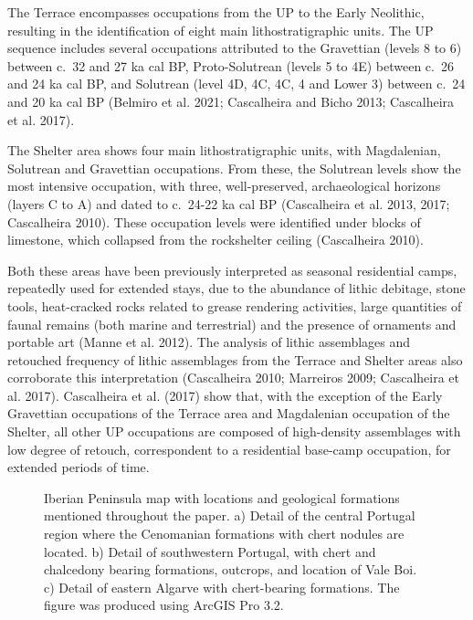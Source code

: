 \documentclass[
  a4paper,
  DIV=11,
  numbers=noendperiod]{scrreprt}
\begin{document}
The Terrace encompasses occupations from the UP to the Early Neolithic,
resulting in the identification of eight main lithostratigraphic units.
The UP sequence includes several occupations attributed to the
Gravettian (levels 8 to 6) between c.~32 and 27 ka cal BP,
Proto-Solutrean (levels 5 to 4E) between c.~26 and 24 ka cal BP, and
Solutrean (level 4D, 4C, 4C, 4 and Lower 3) between c.~24 and 20 ka cal
BP (Belmiro et al. 2021; Cascalheira and Bicho 2013; Cascalheira et al.
2017).

The Shelter area shows four main lithostratigraphic units, with
Magdalenian, Solutrean and Gravettian occupations. From these, the
Solutrean levels show the most intensive occupation, with three,
well-preserved, archaeological horizons (layers C to A) and dated to
c.~24-22 ka cal BP (Cascalheira et al. 2013, 2017; Cascalheira 2010).
These occupation levels were identified under blocks of limestone, which
collapsed from the rockshelter ceiling (Cascalheira 2010).

Both these areas have been previously interpreted as seasonal
residential camps, repeatedly used for extended stays, due to the
abundance of lithic debitage, stone tools, heat-cracked rocks related to
grease rendering activities, large quantities of faunal remains (both
marine and terrestrial) and the presence of ornaments and portable art
(Manne et al. 2012). The analysis of lithic assemblages and retouched
frequency of lithic assemblages from the Terrace and Shelter areas also
corroborate this interpretation (Cascalheira 2010; Marreiros 2009;
Cascalheira et al. 2017). Cascalheira et al. (2017) show that, with the
exception of the Early Gravettian occupations of the Terrace area and
Magdalenian occupation of the Shelter, all other UP occupations are
composed of high-density assemblages with low degree of retouch,
correspondent to a residential base-camp occupation, for extended
periods of time.

\begin{figure}


\caption{\label{fig-map}Iberian Peninsula map with locations and
geological formations mentioned throughout the paper. a) Detail of the
central Portugal region where the Cenomanian formations with chert
nodules are located. b) Detail of southwestern Portugal, with chert and
chalcedony bearing formations, outcrops, and location of Vale Boi. c)
Detail of eastern Algarve with chert-bearing formations. The figure was
produced using ArcGIS Pro 3.2.}

\end{figure}%
\end{document}

